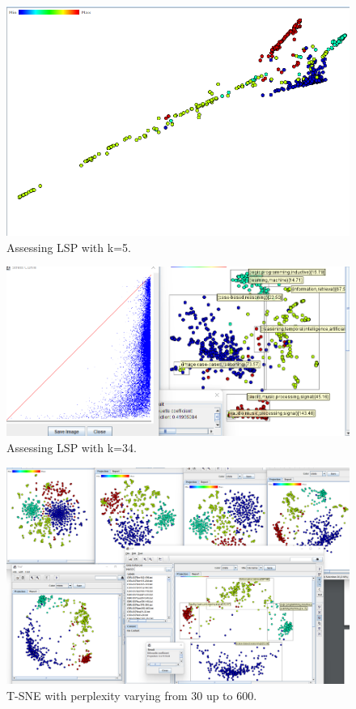 \documentclass[ 10pt ]{fphw}
\begin{document}
\begin{center}
\begin{figure}[H]
    \centering
	\includegraphics[width=0.55\columnwidth]{lspText5classes.png} 
	\caption{Assessing LSP with k=5.}
	\label{fig:lsp5classes}
	\end{figure}
\end{center}

\begin{center}
\begin{figure}[H]
    \centering
	\includegraphics[width=0.55\columnwidth]{lsp34TextBest.png} 
	\caption{Assessing LSP with k=34.}
	\label{fig:bestlsptext}
	\end{figure}
\end{center}



\begin{center}
\begin{figure}[H]
    \centering
	\includegraphics[width=0.85\columnwidth]{tSneupto600.png} 
	\caption{T-SNE with perplexity varying from 30 up to 600.}
	\label{fig:tsneVarying}
	\end{figure}
\end{center}
\end{document}
